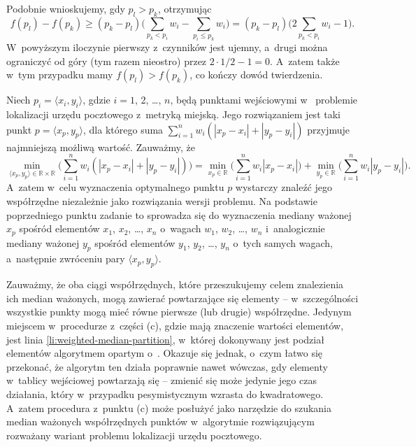 Podobnie wnioskujemy, gdy $p_l>p_k$, otrzymując
\[
    f(p_l)-f(p_k) \ge (p_k-p_l)\biggl(\sum_{p_k<p_i}w_i-\sum_{p_i\le p_k}w_i\biggr) = (p_k-p_l)\biggl(2\sum_{p_k<p_i}w_i-1\biggr).
\]
W~powyższym iloczynie pierwszy z~czynników jest ujemny, a~drugi można ograniczyć od góry (tym razem nieostro) przez $2\cdot1/2-1=0$.
A~zatem także w~tym przypadku mamy $f(p_l)>f(p_k)$, co kończy dowód twierdzenia.

\subproblem %
Niech $p_i=\langle x_i,y_i\rangle$, gdzie $i=1$, 2, \dots, $n$, będą punktami wejściowymi w~ problemie lokalizacji urzędu pocztowego z~metryką miejską.
Jego rozwiązaniem jest taki punkt $p=\langle x_p,y_p\rangle$, dla którego suma $\sum_{i=1}^nw_i(|x_p-x_i|+|y_p-y_i|)$ przyjmuje najmniejszą możliwą wartość.
Zauważmy, że
\[
    \min_{\langle x_p,y_p\rangle\in\mathbb{R}\times\mathbb{R}}\biggl(\sum_{i=1}^nw_i(|x_p-x_i|+|y_p-y_i|)\biggr) = \min_{x_p\in\mathbb{R}}\biggl(\sum_{i=1}^nw_i|x_p-x_i|\biggr)+\min_{y_p\in\mathbb{R}}\biggl(\sum_{i=1}^nw_i|y_p-y_i|\biggr).
\]
A~zatem w~celu wyznaczenia optymalnego punktu $p$ wystarczy znaleźć jego współrzędne niezależnie jako rozwiązania  wersji problemu.
Na podstawie poprzedniego punktu zadanie to sprowadza się do wyznaczenia mediany ważonej $x_p$ spośród elementów $x_1$, $x_2$, \dots, $x_n$ o~wagach $w_1$, $w_2$, \dots, $w_n$ i~analogicznie mediany ważonej $y_p$ spośród elementów $y_1$, $y_2$, \dots, $y_n$ o~tych samych wagach, a~następnie zwróceniu pary $\langle x_p,y_p\rangle$.

Zauważmy, że oba ciągi współrzędnych, które przeszukujemy celem znalezienia ich median ważonych, mogą zawierać powtarzające się elementy -- w~szczególności wszystkie punkty mogą mieć równe pierwsze (lub drugie) współrzędne.
Jedynym miejscem w~procedurze  z~części (c), gdzie mają znaczenie wartości elementów, jest linia \ref{li:weighted-median-partition}, w~której dokonywany jest podział elementów algorytmem opartym o~.
Okazuje się jednak, o~czym łatwo się przekonać, że algorytm ten działa poprawnie nawet wówczas, gdy elementy w~tablicy wejściowej powtarzają się -- zmienić się może jedynie jego czas działania, który w~przypadku pesymistycznym wzrasta do kwadratowego.
A~zatem procedura z~punktu (c) może posłużyć jako narzędzie do szukania median ważonych współrzędnych punktów w~algorytmie rozwiązującym rozważany wariant problemu lokalizacji urzędu pocztowego.
